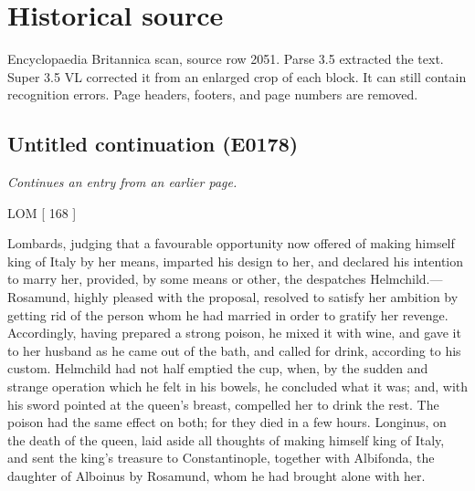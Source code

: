 \documentclass{article}
\begin{document}
\section*{Historical source}
Encyclopaedia Britannica scan, source row 2051. Parse 3.5 extracted the text. Super 3.5 VL corrected it from an enlarged crop of each block. It can still contain recognition errors.
Page headers, footers, and page numbers are removed.

\subsection*{Untitled continuation (E0178)}
\textit{Continues an entry from an earlier page.}

LOM [ 168 ]

Lombards, judging that a favourable opportunity now offered of making himself king of Italy by her means, imparted his design to her, and declared his intention to marry her, provided, by some means or other, the despatches Helmchild.—Rosamund, highly pleased with the proposal, resolved to satisfy her ambition by getting rid of the person whom he had married in order to gratify her revenge. Accordingly, having prepared a strong poison, he mixed it with wine, and gave it to her husband as he came out of the bath, and called for drink, according to his custom. Helmchild had not half emptied the cup, when, by the sudden and strange operation which he felt in his bowels, he concluded what it was; and, with his sword pointed at the queen's breast, compelled her to drink the rest. The poison had the same effect on both; for they died in a few hours. Longinus, on the death of the queen, laid aside all thoughts of making himself king of Italy, and sent the king's treasure to Constantinople, together with Albifonda, the daughter of Alboinus by Rosamund, whom he had brought alone with her.
\end{document}
